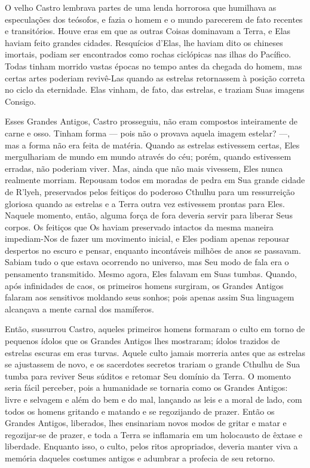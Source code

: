 O velho Castro lembrava partes de uma lenda horrorosa que humilhava as
especulações dos teósofos, e fazia o homem e o mundo parecerem de fato
recentes e transitórios. Houve eras em que as outras Coisas dominavam a
Terra, e Elas haviam feito grandes cidades. Resquícios d'Elas, lhe
haviam dito os chineses imortais, podiam ser encontrados como rochas
ciclópicas nas ilhas do Pacífico. Todas tinham morrido vastas épocas no
tempo antes da chegada do homem, mas certas artes poderiam revivê-Las
quando as estrelas retornassem à posição correta no ciclo da
eternidade. Elas vinham, de fato, das estrelas, e traziam Suas imagens
Consigo.

Esses Grandes Antigos, Castro prosseguiu, não eram compostos
inteiramente de carne e osso. Tinham forma --- pois não o provava aquela
imagem estelar? ---, mas a forma não era feita de matéria. Quando as
estrelas estivessem certas, Eles mergulhariam de mundo em mundo através
do céu; porém, quando estivessem erradas, não poderiam viver. Mas, ainda que
não mais vivessem, Eles nunca realmente morriam. Repousam todos em
moradas de pedra em Sua grande cidade de R'lyeh, preservados pelos
feitiços do poderoso Cthulhu para um ressurreição gloriosa quando as
estrelas e a Terra outra vez estivessem prontas para Eles. Naquele
momento, então, alguma força de fora deveria servir para liberar Seus
corpos. Os feitiços que Os haviam preservado intactos da mesma maneira
impediam-Nos de fazer um movimento inicial, e Eles podiam apenas
repousar despertos no escuro e pensar, enquanto incontáveis milhões de
anos se passavam. Sabiam tudo o que estava ocorrendo no universo, mas
Seu modo de fala era o pensamento transmitido. Mesmo agora, Eles falavam
em Suas tumbas. Quando, após infinidades de caos, os primeiros homens
surgiram, os Grandes Antigos falaram aos sensitivos moldando seus
sonhos; pois apenas assim Sua linguagem alcançava a mente carnal dos
mamíferos.

Então, sussurrou Castro, aqueles primeiros homens formaram o culto em
torno de pequenos ídolos que os Grandes Antigos lhes mostraram; ídolos
trazidos de estrelas escuras em eras turvas. Aquele culto jamais
morreria antes que as estrelas se ajustassem de novo, e os sacerdotes
secretos trariam o grande Cthulhu de Sua tumba para reviver Seus súditos
e retomar Seu domínio da Terra. O momento seria fácil perceber, pois a
humanidade se tornaria como os Grandes Antigos: livre e selvagem e além
do bem e do mal, lançando as leis e a moral de lado, com todos os homens
gritando e matando e se regozijando de prazer. Então os Grandes Antigos,
liberados, lhes ensinariam novos modos de gritar e matar e
regozijar-se de prazer, e toda a Terra se inflamaria em um holocausto de
êxtase e liberdade. Enquanto isso, o culto, pelos ritos apropriados,
deveria manter viva a memória daqueles costumes antigos e adumbrar a
profecia de seu retorno.

